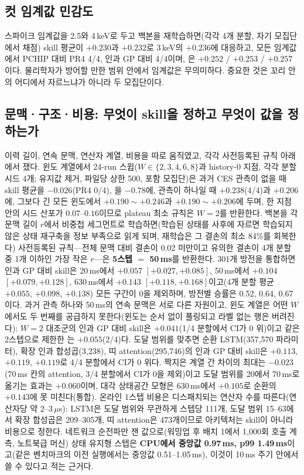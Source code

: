 \documentclass[10pt,a4paper]{article}
\begin{document}
\subsection{컷 임계값 민감도}
\label{sec:cutsens}
스파이크 임계값을 2.5와 4\,keV로 두고 백본을 재학습하면(각각 4개 분할, 자기
모집단에서 채점) \Ti{} skill 평균이 $+0.230$과 $+0.232$로 3\,keV의 $+0.236$에
대응하고, 모든 임계값에서 PCHIP 대비 PR4 4/4, 인과 GP 대비 4/4이며, \Vrot{}은
$+0.252$ / $+0.253$ / $+0.257$이다. 물리학자가 방어할 만한 범위 안에서 임계값은
무의미하다. 중요한 것은 꼬리 안의 어디에서 자르느냐가 아니라 두 모집단이다.

\subsection{문맥·구조·비용: 무엇이 skill을 정하고 무엇이 값을 정하는가}
\label{sec:context}

이력 길이, 연속 문맥, 연산자 계열, 비용을 따로 움직였고, 각각 사전등록된 규칙 아래에서
쟀다. 윈도 계열에서 24-run 스윕($W \in \{2,3,4,6,8\}$과 history-0 지점, 각각 분할 시드
4개; 유지값 제거, 파일당 상한 500, 포함 모집단)은 과거 CES 관측이 없을 때 \Ti{} skill
평균을 $-0.026$(PR4 0/4), \Vrot{}을 $-0.78$에, 관측이 하나일 때 $+0.238$(4/4)과
$+0.206$에, 그보다 긴 모든 윈도에서 $+0.190\sim+0.246$과 $+0.190\sim+0.206$에 두며, 한
지점 안의 시드 산포가 $0.07$--$0.16$이므로 plateau 최소 규칙은 $W = 2$를 반환한다.
백본을 각 문맥 길이 $r$에서 비중첩 세그먼트로 학습하면(학습된 상태를 사후에 자르면
학습되지 않은 상태 재구축을 정보 부족으로 읽게 되며, 재학습은 그 결손의 최소 84\%를
회복한다) 사전등록된 규칙---전체 문맥 대비 결손이 0.02 미만이고 유의한 결손이 4개
분할 중 1개 이하인 가장 작은 $r$---은 \textbf{5스텝 $=$ 50\,ms}를 반환한다. 301개
방전을 통합하면 인과 GP 대비 \Ti{} skill은 20\,ms에서 $+0.057$ $[+0.027, +0.085]$,
50\,ms에서 $+0.104$ $[+0.079, +0.128]$, 630\,ms에서 $+0.143$ $[+0.118, +0.168]$이고(4개
분할 평균 $+0.055$, $+0.098$, $+0.138$) 모든 구간이 0을 제외하며, 방전별 승률은 0.52,
0.64, 0.67이다. 과거 관측 하나와 50\,ms의 연속 문맥은 서로 다른 자원이고, 윈도 계열은
어떤 $W$에서도 두 번째를 공급하지 못한다(윈도는 순서 없이 풀링되고 라벨 없는 행은
버려진다): $W{=}2$ 대조군의 인과 GP 대비 skill은 $+0.041$(1/4 분할에서 CI가 0 위)이고
같은 2스텝으로 제한한 \seqv{}는 $+0.055$(2/4)다. 도달 범위를 맞추면 순환
LSTM(357{,}570 파라미터), 확장 인과 합성곱(3{,}238), 띠 attention(295{,}746)의 인과 GP
대비 \Ti{} skill은 $+0.113$, $+0.119$, $+0.119$로 4/4 분할에서 CI가 0 위다. 짝지은
계열 간 차이의 최대는 $-0.023$(70\,ms 칸의 attention, 3/4 분할에서 CI가 0을 제외)이고
도달 범위를 20에서 70\,ms로 옮기는 효과는 $+0.060$이며, 대각 상태공간 모형은
630\,ms에서 $+0.105$로 순환의 $+0.143$에 못 미친다(통합). 온라인 1스텝 비용은
디스패치되는 연산자 수를 따른다(연산자당 약 2--3\,$\mu$s): LSTM은 도달 범위와 무관하게
스텝당 111개, 도달 범위 15--63에서 확장 합성곱은 209--305개, 띠 attention은
473개이므로 아키텍처는 skill이 아니라 비용으로 정한다. 네트워크 순전파만 잰
값으로(워밍업 후 배치 1에서 1{,}000회 호출 계측, 노트북급 머신) 상태 유지형 \seqv{}
스텝은 \textbf{CPU에서 중앙값 0.97\,ms, p99 1.49\,ms}이고(같은 벤치마크의 이전
실행에서는 중앙값 0.51--1.05\,ms), 이것이 10\,ms 주기 안에서 쓸 수 있다고 적는
근거다.
\end{document}
